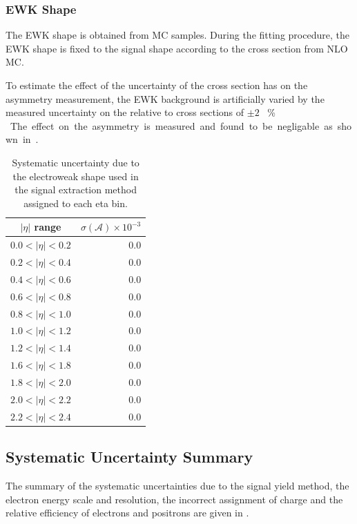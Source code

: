 \subsubsection{EWK \ETm Shape}

The \ac{EWK} shape is obtained from \ac{MC} samples. During the fitting
procedure, the \ac{EWK} shape is fixed to the \Wenu signal shape according to
the cross section from NLO \ac{MC}.

To estimate the effect of the uncertainty of the cross section has on the
asymmetry measurement, the \ac{EWK} background is artificially varied by the
measured uncertainty on the relative \PW to \PZ cross sections of \unit{$\pm2$}{
\% }. The effect on the asymmetry is measured and found to be negligable as
shown in .

\begin{table}[htbp]
\begin{center}
\begin{tabular}{cr}
\toprule
$|\eta|$ range & $\sigma(\mathcal{A}) \times 10^{-3}$\\
\midrule
$0.0<|\eta|<0.2$ & 0.0\\
$0.2<|\eta|<0.4$ & 0.0\\
$0.4<|\eta|<0.6$ & 0.0\\
$0.6<|\eta|<0.8$ & 0.0\\
$0.8<|\eta|<1.0$ & 0.0\\
$1.0<|\eta|<1.2$ & 0.0\\
$1.2<|\eta|<1.4$ & 0.0\\
$1.6<|\eta|<1.8$ & 0.0\\
$1.8<|\eta|<2.0$ & 0.0\\
$2.0<|\eta|<2.2$ & 0.0\\
$2.2<|\eta|<2.4$ & 0.0\\
\bottomrule
\end{tabular}
\caption{\label{tab:updatedsystewk}Systematic uncertainty due to the electroweak \MET shape used in the signal extraction method assigned to each eta bin.}
\end{center}
\end{table}

\subsection{Systematic Uncertainty Summary}
The summary of the systematic uncertainties due to the signal yield method, the
electron energy scale and resolution, the incorrect assignment of charge and the
relative efficiency of electrons and positrons are given in
.


